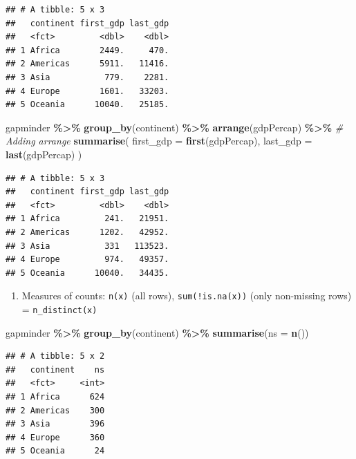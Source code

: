 \documentclass[
]{book}
\newenvironment{Shaded}{\begin{snugshade}}{\end{snugshade}}
\newcommand{\AttributeTok}[1]{\textcolor[rgb]{0.13,0.29,0.53}{#1}}
\newcommand{\CommentTok}[1]{\textcolor[rgb]{0.56,0.35,0.01}{\textit{#1}}}
\newcommand{\FunctionTok}[1]{\textcolor[rgb]{0.13,0.29,0.53}{\textbf{#1}}}
\newcommand{\NormalTok}[1]{#1}
\newcommand{\SpecialCharTok}[1]{\textcolor[rgb]{0.81,0.36,0.00}{\textbf{#1}}}
\providecommand{\tightlist}{%
  \setlength{\itemsep}{0pt}\setlength{\parskip}{0pt}}
\begin{document}
\begin{verbatim}
## # A tibble: 5 x 3
##   continent first_gdp last_gdp
##   <fct>         <dbl>    <dbl>
## 1 Africa        2449.     470.
## 2 Americas      5911.   11416.
## 3 Asia           779.    2281.
## 4 Europe        1601.   33203.
## 5 Oceania      10040.   25185.
\end{verbatim}

\begin{Shaded}
\begin{Highlighting}[]
\NormalTok{gapminder }\SpecialCharTok{\%\textgreater{}\%}
  \FunctionTok{group\_by}\NormalTok{(continent) }\SpecialCharTok{\%\textgreater{}\%}
  \FunctionTok{arrange}\NormalTok{(gdpPercap) }\SpecialCharTok{\%\textgreater{}\%} \CommentTok{\# Adding arrange}
  \FunctionTok{summarise}\NormalTok{(}
    \AttributeTok{first\_gdp =} \FunctionTok{first}\NormalTok{(gdpPercap),}
    \AttributeTok{last\_gdp =} \FunctionTok{last}\NormalTok{(gdpPercap)}
\NormalTok{  )}
\end{Highlighting}
\end{Shaded}

\begin{verbatim}
## # A tibble: 5 x 3
##   continent first_gdp last_gdp
##   <fct>         <dbl>    <dbl>
## 1 Africa         241.   21951.
## 2 Americas      1202.   42952.
## 3 Asia           331   113523.
## 4 Europe         974.   49357.
## 5 Oceania      10040.   34435.
\end{verbatim}

\begin{enumerate}
\def\labelenumi{\arabic{enumi}.}
\setcounter{enumi}{3}
\tightlist
\item
  Measures of counts: \texttt{n(x)} (all rows), \texttt{sum(!is.na(x))} (only non-missing rows) = \texttt{n\_distinct(x)}
\end{enumerate}

\begin{Shaded}
\begin{Highlighting}[]
\NormalTok{gapminder }\SpecialCharTok{\%\textgreater{}\%}
  \FunctionTok{group\_by}\NormalTok{(continent) }\SpecialCharTok{\%\textgreater{}\%}
  \FunctionTok{summarise}\NormalTok{(}\AttributeTok{ns =} \FunctionTok{n}\NormalTok{())}
\end{Highlighting}
\end{Shaded}

\begin{verbatim}
## # A tibble: 5 x 2
##   continent    ns
##   <fct>     <int>
## 1 Africa      624
## 2 Americas    300
## 3 Asia        396
## 4 Europe      360
## 5 Oceania      24
\end{verbatim}
\end{document}
